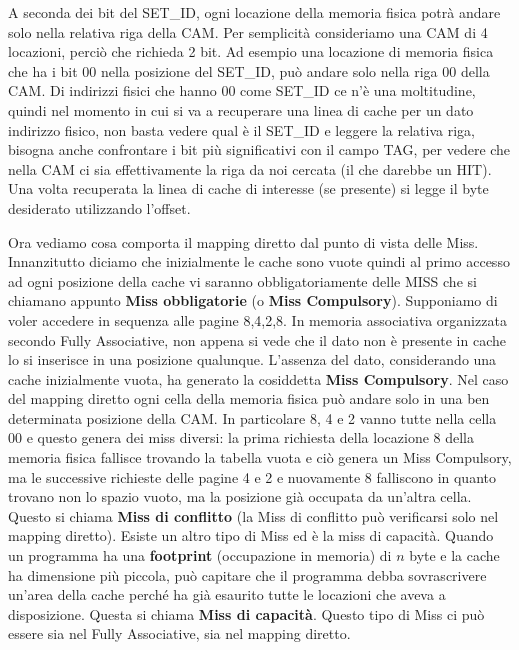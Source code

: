 \documentclass[11pt]{book}
\begin{document}
A seconda dei bit del SET\_ID, ogni locazione della memoria fisica
potr\`a andare solo nella relativa riga della CAM. Per semplicit\`a
consideriamo una CAM di 4 locazioni, perci\`o che richieda 2 bit. Ad
esempio una locazione di memoria fisica che ha i bit 00 nella
posizione del SET\_ID, pu\`o andare solo nella riga 00 della CAM. Di
indirizzi fisici che hanno 00 come SET\_ID ce n'\`e una moltitudine,
quindi nel momento in cui si va a recuperare una linea di cache per un
dato indirizzo fisico, non basta vedere qual \`e il SET\_ID e leggere
la relativa riga, bisogna anche confrontare i bit pi\`u significativi
con il campo TAG, per vedere che nella CAM ci sia effettivamente la
riga da noi cercata (il che darebbe un HIT). Una volta recuperata la
linea di cache di interesse (se presente) si legge il byte desiderato
utilizzando l'offset.

\par\bigskip

Ora vediamo cosa comporta il mapping diretto dal punto di vista delle
Miss. Innanzitutto diciamo che inizialmente le cache sono vuote quindi
al primo accesso ad ogni posizione della cache vi saranno
obbligatoriamente delle MISS che si chiamano appunto {\bf Miss
  obbligatorie} (o {\bf Miss Compulsory}). Supponiamo di voler
accedere in sequenza alle pagine 8,4,2,8. In memoria associativa
organizzata secondo Fully Associative, non appena si vede che il dato
non \`e presente in cache lo si inserisce in una posizione
qualunque. L'assenza del dato, considerando una cache inizialmente
vuota, ha generato la cosiddetta {\bf Miss Compulsory}. Nel caso del
mapping diretto ogni cella della memoria fisica pu\`o andare solo in
una ben determinata posizione della CAM. In particolare 8, 4 e 2 vanno
tutte nella cella 00 e questo genera dei miss diversi: la prima
richiesta della locazione 8 della memoria fisica fallisce trovando la
tabella vuota e ci\`o genera un Miss Compulsory, ma le successive
richieste delle pagine 4 e 2 e nuovamente 8 falliscono in quanto
trovano non lo spazio vuoto, ma la posizione gi\`a occupata da
un'altra cella. Questo si chiama {\bf Miss di conflitto} (la Miss di
conflitto pu\`o verificarsi solo nel mapping diretto). Esiste un altro
tipo di Miss ed \`e la miss di capacit\`a. Quando un programma ha una
{\bf footprint} (occupazione in memoria) di $n$ byte e la cache ha
dimensione pi\`u piccola, pu\`o capitare che il programma debba
sovrascrivere un'area della cache perch\'e ha gi\`a esaurito tutte le
locazioni che aveva a disposizione. Questa si chiama {\bf Miss di
  capacit\`a}. Questo tipo di Miss ci pu\`o essere sia nel Fully
Associative, sia nel mapping diretto. 
\end{document}
